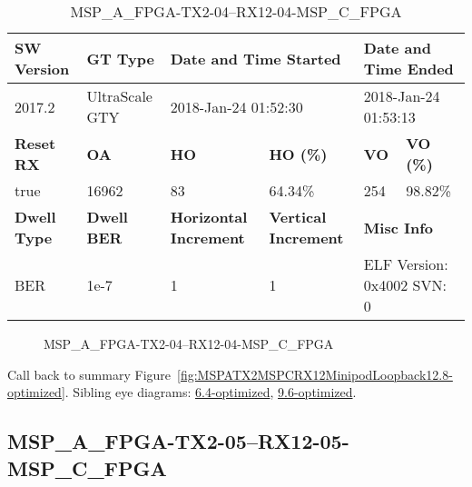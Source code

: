 \begin{table}[h]
\centering
\caption{MSP\_A\_FPGA-TX2-04--RX12-04-MSP\_C\_FPGA}
\label{tab:MSPAFPGATX204RX1204MSPCFPGA12.8-optimized}
\begin{tabular}{@{}|l|l|l|l|l|l|@{}}
\toprule
\textbf{SW Version}                & \textbf{GT Type}   & \multicolumn{2}{l|}{\textbf{Date and Time Started}}            & \multicolumn{2}{l|}{\textbf{Date and Time Ended}}        \\ \midrule
2017.2                       & UltraScale GTY          & \multicolumn{2}{l|}{2018-Jan-24 01:52:30}                   & \multicolumn{2}{l|}{2018-Jan-24 01:53:13}               \\ \midrule
\textbf{Reset RX}                  & \textbf{OA} & \textbf{HO}   & \textbf{HO (\%)} & \textbf{VO} & \textbf{VO (\%)} \\ \midrule
true & 16962        & 83          & 64.34\%        & 254        & 98.82\%       \\ \midrule
\textbf{Dwell Type}                & \textbf{Dwell BER} & \textbf{Horizontal Increment} & \textbf{Vertical Increment}    & \multicolumn{2}{l|}{\textbf{Misc Info}}                  \\ \midrule
BER                            & 1e-7        & 1        & 1           & \multicolumn{2}{l|}{ELF Version: 0x4002 SVN: 0}                         \\ \bottomrule
\end{tabular}
\end{table}

\begin{figure}[h]
\caption{MSP\_A\_FPGA-TX2-04--RX12-04-MSP\_C\_FPGA} \label{fig:MSPAFPGATX204RX1204MSPCFPGA12.8-optimized}
\end{figure}

Call back to summary Figure~\ref{fig:MSPATX2MSPCRX12MinipodLoopback12.8-optimized}.
Sibling eye diagrams: \hyperref[sec:MSPAFPGATX204RX1204MSPCFPGA6.4-optimized]{6.4-optimized}, \hyperref[sec:MSPAFPGATX204RX1204MSPCFPGA9.6-optimized]{9.6-optimized}.

\clearpage
\newpage


\subsection{MSP\_A\_FPGA-TX2-05--RX12-05-MSP\_C\_FPGA}\label{sec:MSPAFPGATX205RX1205MSPCFPGA12.8-optimized}

